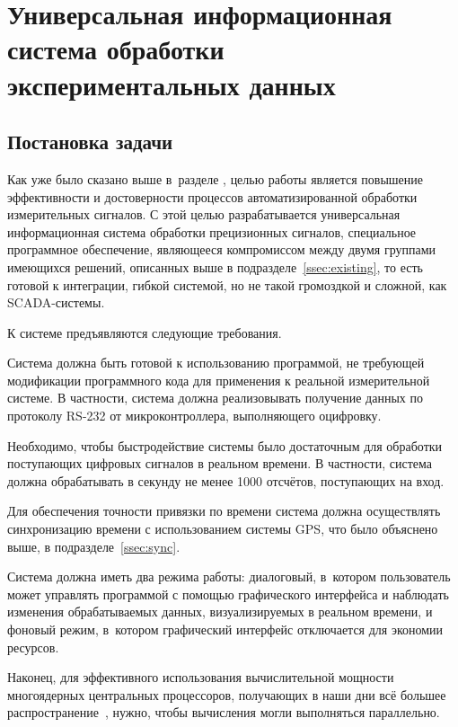 \documentclass[a4paper, 14pt, titlepage]{extarticle}
\let\oldsection\section
\renewcommand{\section}{\newpage\oldsection}
\begin{document}
  \section{Универсальная информационная система обработки экспериментальных данных}

  \subsection{Постановка задачи}\label{ssec:task}

  Как уже было сказано выше в~разделе ,
  целью работы является повышение эффективности и достоверности процессов автоматизированной
  обработки измерительных сигналов. С этой целью разрабатывается универсальная информационная
  система обработки прецизионных сигналов,
  специальное программное обеспечение,
  являющееся компромиссом между двумя группами имеющихся решений, описанных выше в
  подразделе~\ref{ssec:existing}, то есть готовой к интеграции, гибкой системой, но не такой
  громоздкой и сложной, как SCADA-системы.

  К системе предъявляются следующие требования.

  Система должна быть готовой к использованию программой, не требующей модификации программного кода
  для применения к реальной измерительной системе. В частности, система должна реализовывать
  получение данных по протоколу RS-232\cite{sweet-serial} от микроконтроллера, выполняющего оцифровку.

  Необходимо, чтобы быстродействие системы было достаточным для обработки поступающих цифровых
  сигналов в реальном времени. В частности, система должна обрабатывать в секунду не менее 1000
  отсчётов, поступающих на вход.

  Для обеспечения точности привязки по времени система должна осуществлять синхронизацию времени с
  использованием системы GPS, что было объяснено выше, в подразделе~\ref{ssec:sync}.

  Система должна иметь два режима работы: диалоговый, в~котором пользователь может управлять
  программой с помощью графического интерфейса и наблюдать изменения обрабатываемых данных,
  визуализируемых в реальном времени, и фоновый режим, в~котором графический интерфейс отключается
  для экономии ресурсов.

  Наконец, для эффективного использования вычислительной мощности многоядерных центральных
  процессоров, получающих в наши дни всё большее распространение~\cite{steam-hardware}, нужно, чтобы
  вычисления могли выполняться параллельно.
\end{document}

